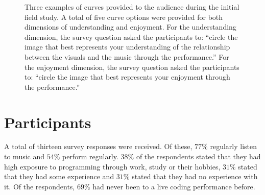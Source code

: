 \begin{figure}
\centering
{}
\hfill
{}
\hfill
{}
\caption[Exploratory field study survey dimension curves]{Three examples of curves provided to the audience during the
initial field study. A total of five curve options were provided for
both dimensions of understanding and enjoyment. For the understanding
dimension, the survey question asked the participants to: ``circle the
image that best represents your understanding of the relationship
between the visuals and the music through the performance.'' For the
enjoyment dimension, the survey question asked the participants to:
``circle the image that best represents your enjoyment through the
performance.''}
\label{fig:field-study-curves}
\end{figure}


\section{Participants}

A total of thirteen survey responses were received. Of these, $77\%$ regularly listen to music and $54\%$ perform regularly. $38\%$ of the respondents stated that they had high exposure to programming through work, study or their hobbies, $31\%$ stated that they had some experience and $31\%$ stated that they had no experience with it. Of the respondents, $69\%$ had never been to a live coding performance before.

